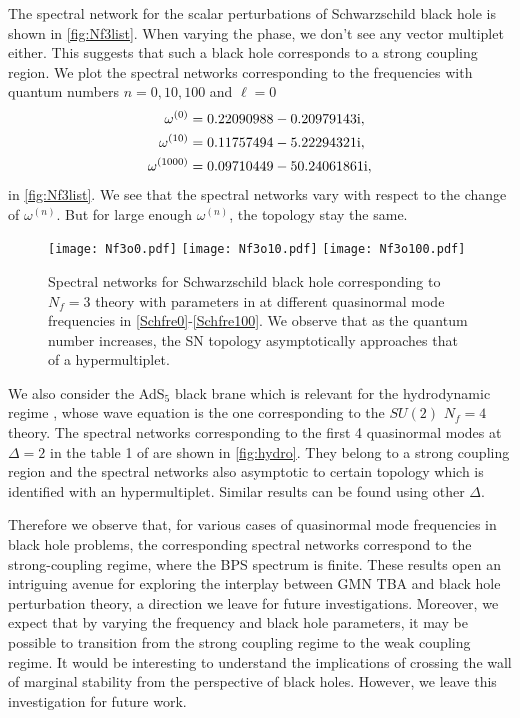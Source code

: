 \documentclass[11pt]{article}
\numberwithin{equation}{section}
\newcommand{\ri}{{\rm i}}
\begin{document}
The spectral network for the scalar perturbations of  
Schwarzschild black hole is shown in \autoref{fig:Nf3list}.
When varying the phase, we don't see any vector multiplet either. This suggests that such a black hole corresponds to a strong coupling region. We plot the spectral networks corresponding to the  frequencies with quantum numbers $n=0,10,100$ and $\ell=0$ \cite{Berti:2009kk,Motl:2003cd}
\begin{align}
\label{Schfre0}\omega^{(0)}&=0.22090988-0.20979143\ri,\\
\label{Schfre10}\omega^{(10)}&= 0.11757494-  5.22294321\ri,\\
\label{Schfre100}\omega^{(1000)}&= 0.09710449 - 50.24061861\ri,
\end{align}
in \autoref{fig:Nf3list}. We see that the spectral networks vary with respect to the change of $\omega^{(n)}$. But for large enough $\omega^{(n)}$, the topology stay the same. 
%
\begin{figure}
    \centering
    \texttt{[image: Nf3o0.pdf]}
    \texttt{[image: Nf3o10.pdf]}
    \texttt{[image: Nf3o100.pdf]}
    \caption{Spectral networks for Schwarzschild black hole corresponding to $N_f=3$ theory with parameters in \cite{Aminov:2020yma} at different quasinormal mode frequencies in \eqref{Schfre0}-\eqref{Schfre100}. We observe that as the quantum number increases, the SN topology asymptotically approaches that of a hypermultiplet. }
    \label{fig:Nf3list}
\end{figure}





We also consider the AdS$_5$ black brane which is relevant for the hydrodynamic regime \cite{Nunez:2003eq}, whose wave equation is the one corresponding to the $SU(2)$ $N_f=4$ theory.  
% 
The spectral networks corresponding to the first 4 quasinormal modes at $\Delta=2$ in the table 1 of \cite{Nunez:2003eq} are shown in \autoref{fig:hydro}.  They belong to a strong coupling region and the spectral networks also asymptotic to certain topology  which is identified with an hypermultiplet. Similar results can be found using other $\Delta$.


Therefore we observe that, for various cases of quasinormal mode frequencies in black hole problems, 
the corresponding spectral networks correspond to the strong-coupling regime, where the BPS spectrum is finite. 
 These results open an intriguing avenue for exploring the interplay between GMN TBA and black hole perturbation theory, a direction we leave for future investigations. 
Moreover, we expect that by varying the frequency and black hole parameters, it may be possible to transition from the strong coupling regime to the weak coupling regime. It would be  interesting to understand the implications of crossing the wall of marginal stability from the perspective of black holes.  However, we leave this investigation for future work.
\end{document}
